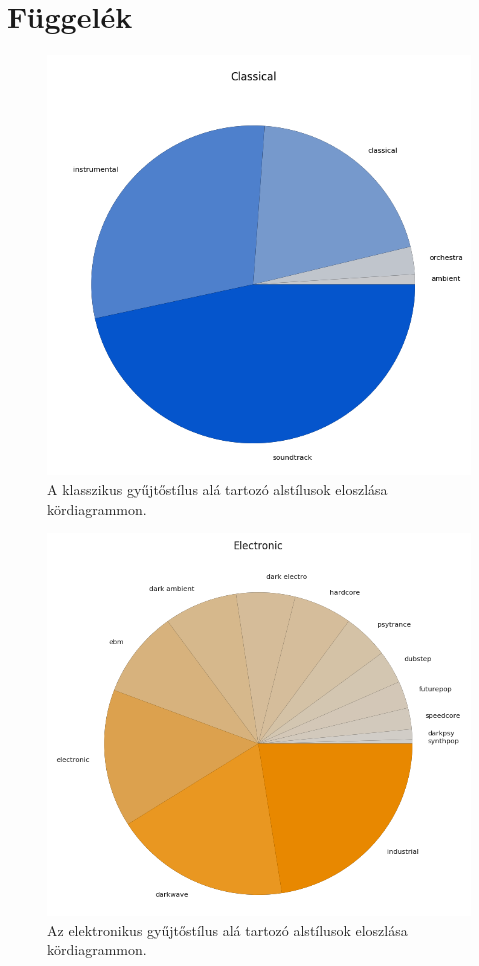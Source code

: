 \pagebreak
\pagestyle{semifancy}
\chapter{Függelék}

\begin{figure}[p]
    \includegraphics{src/images/classical_dist.png}
    \caption{A klasszikus gyűjtőstílus alá tartozó alstílusok eloszlása kördiagrammon.}
\end{figure}

\begin{figure}[p]
    \includegraphics{src/images/electronic_dist.png}
    \caption{Az elektronikus gyűjtőstílus alá tartozó alstílusok eloszlása kördiagrammon.}
\end{figure}

